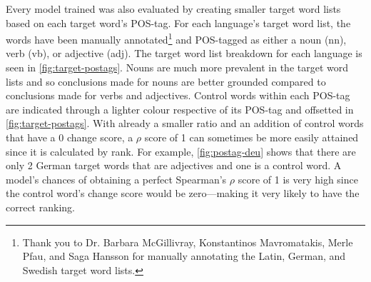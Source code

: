 Every model trained was also evaluated by creating smaller target word lists based on each target word’s POS-tag. For each language’s target word list, the words have been manually annotated\footnote{Thank you to Dr. Barbara McGillivray, Konstantinos Mavromatakis, Merle Pfau, and Saga Hansson for manually annotating the Latin, German, and Swedish target word lists.} and POS-tagged as either a noun (nn), verb (vb), or adjective (adj). The target word list breakdown for each language is seen in \autoref{fig:target-postags}. Nouns are much more prevalent in the target word lists and so conclusions made for nouns are better grounded compared to conclusions made for verbs and adjectives. Control words within each POS-tag are indicated through a lighter colour respective of its POS-tag and offsetted in \autoref{fig:target-postags}. With already a smaller ratio and an addition of control words that have a 0 change score, a $\rho$ score of 1 can sometimes be more easily attained since it is calculated by rank. For example, \autoref{fig:postag-deu} shows that there are only 2 German target words that are adjectives and one is a control word. A model’s chances of obtaining a perfect Spearman's $\rho$ score of 1 is very high since the control word's change score would be zero—making it very likely to have the correct ranking. 


